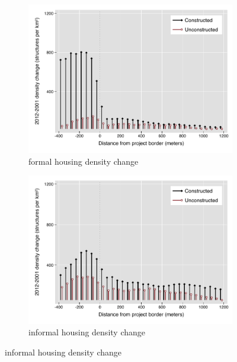 \documentclass[12pt]{article}
\begin{document}
\begin{figure}
        \centering
        \caption[ Changes in Housing Densities in Constructed and Unconstructed Projects Areas]
        {\small Housing Densities in Constructed and Unconstructed projects } 
        \begin{subfigure}[b]{0.495\textwidth}   
            \centering 
            \includegraphics[width=\textwidth,trim={0.3cm .3cm 0.1cm 0cm}, clip=true]{figures/bblu_for_rawchanges_4.pdf}
            \caption[]%
            {{\small formal housing density change}}    
            \label{fig:forchange}
        \end{subfigure}
        \hfill
        \begin{subfigure}[b]{0.495\textwidth}   
            \centering 
            \includegraphics[width=\textwidth,trim={0.3cm .3cm 0.1cm 0cm}, clip=true]{figures/bblu_inf_rawchanges_4.pdf}
            \caption[]%
            {{\small informal housing density change}}    
            \label{fig:infchange}
        \end{subfigure}
        \label{fig:rawbblumeanschange}
        \vspace{-6mm}
    \end{figure} 
\end{document}
